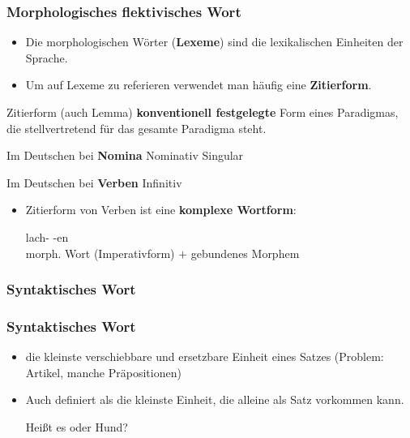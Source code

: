 \begin{frame}
\frametitle{Morphologisches \vs flektivisches Wort}

\begin{itemize}
	\item Die morphologischen Wörter (\textbf{Lexeme}) sind die lexikalischen Einheiten der Sprache.
	
	\item Um auf Lexeme zu referieren verwendet man häufig eine \textbf{Zitierform}.
\end{itemize}
	
	\begin{block}{Zitierform (auch Lemma)}
		\textbf{konventionell festgelegte} Form eines Paradigmas, die stellvertretend für das gesamte Paradigma steht.
		
		Im Deutschen bei \textbf{Nomina} \ras Nominativ Singular
		
		Im Deutschen bei \textbf{Verben} \ras Infinitiv
		
	\end{block} 

\begin{itemize}
	\item Zitierform von Verben ist eine \textbf{komplexe Wortform}:
	
	\ea
	\gll lach- {} -en\\
	{\footnotesize morph. Wort (Imperativform)} $+$ {\footnotesize gebundenes Morphem}\\
	
	\z 
\end{itemize}
\end{frame}


\subsubsection{Syntaktisches Wort}


\begin{frame}
\frametitle{Syntaktisches Wort}

\begin{itemize}
	\item die kleinste verschiebbare und ersetzbare Einheit eines Satzes
(Problem: Artikel, manche Präpositionen)
	
	  \eal
          \zl

	\item Auch definiert als die kleinste Einheit, die alleine als Satz
vorkommen kann.

\eal
\ex Heißt es  oder  Hund?
\ex {}
\zl
		 
\end{itemize}


\end{frame}


